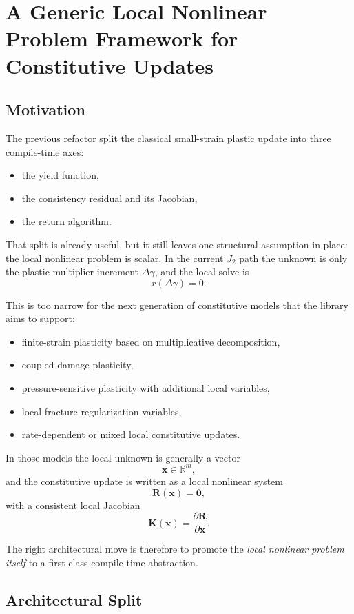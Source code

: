 \chapter{A Generic Local Nonlinear Problem Framework for Constitutive Updates}

\section{Motivation}

The previous refactor split the classical small-strain plastic update into
three compile-time axes:
\begin{itemize}
  \item the yield function,
  \item the consistency residual and its Jacobian,
  \item the return algorithm.
\end{itemize}

That split is already useful, but it still leaves one structural assumption in
place: the local nonlinear problem is scalar.  In the current $J_2$ path the
unknown is only the plastic-multiplier increment $\Delta\gamma$, and the local
solve is
\[
  r(\Delta\gamma) = 0.
\]

This is too narrow for the next generation of constitutive models that the
library aims to support:
\begin{itemize}
  \item finite-strain plasticity based on multiplicative decomposition,
  \item coupled damage-plasticity,
  \item pressure-sensitive plasticity with additional local variables,
  \item local fracture regularization variables,
  \item rate-dependent or mixed local constitutive updates.
\end{itemize}

In those models the local unknown is generally a vector
\[
  \mathbf{x} \in \mathbb{R}^m,
\]
and the constitutive update is written as a local nonlinear system
\[
  \mathbf{R}(\mathbf{x}) = \mathbf{0},
\]
with a consistent local Jacobian
\[
  \mathbf{K}(\mathbf{x}) =
  \frac{\partial \mathbf{R}}{\partial \mathbf{x}}.
\]

The right architectural move is therefore to promote the \emph{local nonlinear
problem itself} to a first-class compile-time abstraction.

\section{Architectural Split}

